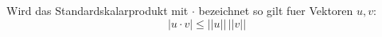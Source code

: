 Wird das Standardskalarprodukt mit $\cdot$ bezeichnet so gilt fuer Vektoren $u,v$: $$|u \cdot v| \leq ||u|| \, ||v||$$
